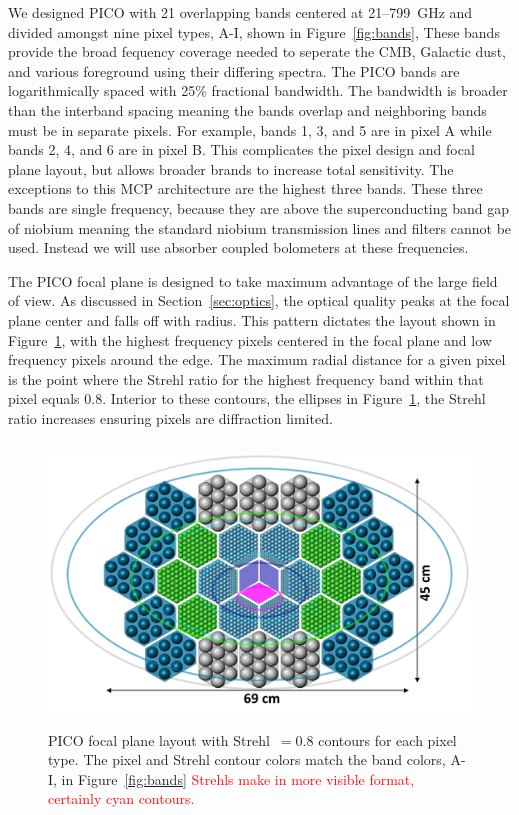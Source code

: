 \documentclass[]{spie}  %
\newcommand{\comr}[1]{\textcolor{red}{#1}}
\begin{document}
We designed PICO with 21 overlapping bands centered at 21--799~GHz and divided amongst nine pixel types, A-I, shown in Figure~\ref{fig:bands}, 
These bands provide the broad fequency coverage needed to seperate the CMB, Galactic dust, and various foreground using their differing spectra.  
The PICO bands are 
logarithmically spaced with 25\% fractional bandwidth.  The bandwidth is broader than the interband spacing meaning the bands 
overlap and neighboring bands must be in separate pixels.  For example, bands 1, 3, and 5 are in pixel A while bands 2, 4, and 6 are in pixel B.  This 
complicates the pixel design and focal plane layout, but allows broader brands to increase total sensitivity.  The exceptions to this MCP architecture 
are the highest three bands.  These three bands are single frequency, because they are above the superconducting band gap of niobium meaning the standard 
niobium transmission lines and filters cannot be used.  Instead we will use absorber coupled bolometers at these frequencies.  

The PICO focal plane is designed to take maximum advantage of the large field of view.  As discussed in Section~\ref{sec:optics}, the optical quality peaks at the 
focal plane center and falls off with radius.  This pattern dictates the layout shown in Figure~\ref{fig:focal_plane}, with the highest frequency 
pixels centered in the focal plane and low frequency pixels around the edge. The maximum radial distance for a given pixel is the point where 
the Strehl ratio for the highest frequency band within that pixel equals 0.8.  Interior to these contours, the ellipses in 
Figure~\ref{fig:focal_plane}, the Strehl ratio increases ensuring pixels are diffraction limited.

\begin{figure} [ht]
\begin{center}
\includegraphics[height=7.5cm]{version3_focal_plane.png}
\end{center}
\caption { \label{fig:focal_plane} 
PICO focal plane layout with Strehl~$=0.8$ contours for each pixel type. The pixel and Strehl contour colors match the band colors, A-I, 
in Figure~\ref{fig:bands} \comr{Strehls make in more visible format, certainly cyan contours.}}
\end{figure} 
\end{document}

